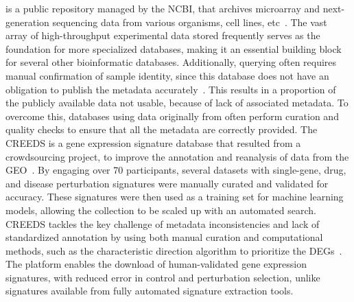  is a public repository managed by the \gls{NCBI}, that archives microarray and next-generation sequencing data from various organisms, cell lines, etc~\cite{RN89}. 
The vast array of high-throughput experimental data stored frequently serves as the foundation for more specialized databases, making it an essential building block for several other bioinformatic databases. 
Additionally, querying  often requires manual confirmation of sample identity, since this database does not have an obligation to publish the metadata accurately~\cite{RN115}. 
This results in a proportion of the publicly available data  not usable, because of lack of associated metadata. 
To overcome this, databases using data originally from  often perform curation and quality checks to ensure that all the metadata are correctly provided. 
The \gls{CREEDS} is a gene expression signature database that resulted from a crowdsourcing project, to improve the annotation and reanalysis of data from the \gls{GEO}~\cite{RN87}. 
By engaging over 70 participants, several datasets with single-gene, drug, and disease perturbation signatures were manually curated and validated for accuracy. 
These signatures were then used as a training set for machine learning models, allowing the collection to be scaled up with an automated search. 
\gls{CREEDS} tackles the key challenge of metadata inconsistencies and lack of standardized annotation by using both manual curation and computational methods, such as the characteristic direction algorithm to prioritize the DEGs~\cite{RN87}. 
The platform enables the download of human-validated gene expression signatures, with reduced error in control and perturbation selection, unlike signatures available from fully automated signature extraction tools.

